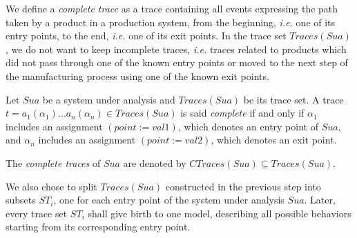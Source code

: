 We define a \textit{complete trace} as a trace containing all
events expressing the path taken by a product in a production
system, from the beginning, \emph{i.e.} one of its entry points,
to the end, \emph{i.e.} one of its exit points. In the trace set
$Traces(Sua)$, we do not want to keep incomplete traces,
\emph{i.e.}  traces related to products which did not pass
through one of the known entry points or moved to the next step
of the manufacturing process using one of the known exit points.

\begin{definition}
    Let $\mathit{Sua}$ be a system under analysis and
    $Traces({Sua})$ be its trace set. A trace $t=a_1(\alpha_1)
    \dots a_n(\alpha_n) \in Traces({Sua})$ is said
    \emph{complete} if and only if $\alpha_1$ includes an
    assignment $(point:=val1)$, which denotes an entry point of
    $\mathit{Sua}$, and $\alpha_n$ includes an assignment
    $(point:=val2)$, which denotes an exit point.

    The \emph{complete traces} of $\mathit{Sua}$ are denoted by
    $CTraces({Sua}) \subseteq Traces({Sua})$.
\end{definition}

We also chose to split $Traces(Sua)$ constructed in the previous step
into subsets $ST_i$, one for each entry point of the system under
analysis $\mathit{Sua}$. Later, every trace set $ST_i$ shall give
birth to one model, describing all possible behaviors starting
from its corresponding entry point.

